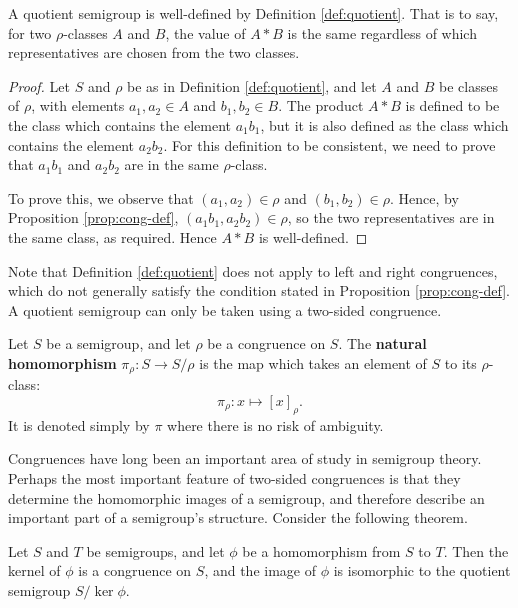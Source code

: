 \begin{proposition}
  \label{thm:quotient-well-defined}
  A quotient semigroup is well-defined by Definition \ref{def:quotient}.  That
  is to say, for two $\rho$-classes $A$ and $B$, the value of $A * B$ is the
  same regardless of which representatives are chosen from the two classes.
  \begin{proof}
    Let $S$ and $\rho$ be as in Definition \ref{def:quotient}, and let $A$ and
    $B$ be classes of $\rho$, with elements $a_1,a_2 \in A$ and $b_1,b_2 \in B$.
    The product $A*B$ is defined to be the class which contains the element
    $a_1b_1$, but it is also defined as the class which contains the element
    $a_2b_2$.  For this definition to be consistent, we need to prove that
    $a_1b_1$ and $a_2b_2$ are in the same $\rho$-class.

    To prove this, we observe that $(a_1,a_2) \in \rho$ and
    $(b_1,b_2) \in \rho$.  Hence, by Proposition \ref{prop:cong-def},
    $(a_1b_1, a_2b_2) \in \rho$, so the two representatives are in the same
    class, as required.  Hence $A * B$ is well-defined.
  \end{proof}
\end{proposition}

Note that Definition \ref{def:quotient} does not apply to left and right
congruences, which do not generally satisfy the condition stated in Proposition
\ref{prop:cong-def}.  A quotient semigroup can only be taken using a two-sided
congruence.

\begin{definition}
  \label{def:natural-homomorphism}
  Let $S$ be a semigroup, and let $\rho$ be a congruence on $S$.  The
  \textbf{natural homomorphism} $\pi_\rho: S \to S / \rho$ is the map which
  takes an element of $S$ to its $\rho$-class:
  $$\pi_\rho: x \mapsto [x]_\rho.$$
  It is denoted simply by $\pi$ where there is no risk of ambiguity.
\end{definition}

Congruences have long been an important area of study in semigroup theory.
Perhaps the most important feature of two-sided congruences is that they
determine the homomorphic images of a semigroup, and therefore describe an
important part of a semigroup's structure.  Consider the following theorem.

\begin{theorem}
  \label{thm:first-isomorphism}
  Let $S$ and $T$ be semigroups, and let $\phi$ be a homomorphism from $S$ to
  $T$.  Then the kernel of $\phi$ is a congruence on $S$, and the image of
  $\phi$ is isomorphic to the quotient semigroup $S / \ker{\phi}$.
\end{theorem}

